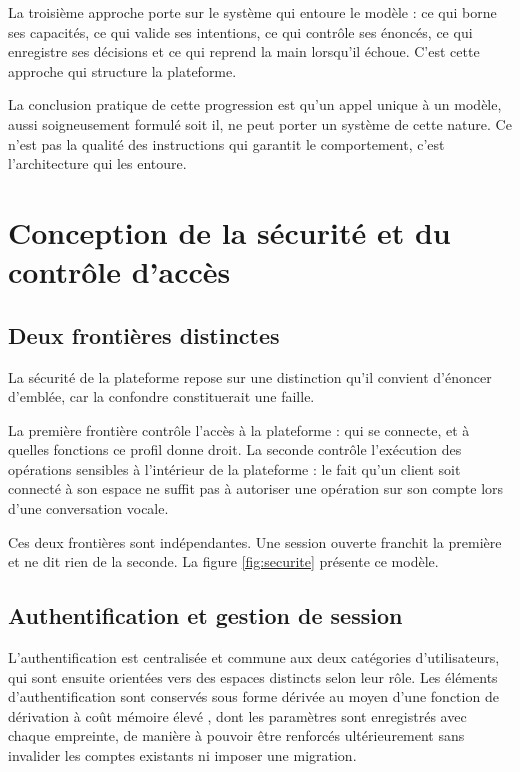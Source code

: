 La troisième approche porte sur le système qui entoure le modèle : ce qui borne ses capacités, ce qui valide ses intentions, ce qui contrôle ses énoncés, ce qui enregistre ses décisions et ce qui reprend la main lorsqu'il échoue. C'est cette approche qui structure la plateforme.

La conclusion pratique de cette progression est qu'un appel unique à un modèle, aussi soigneusement formulé soit il, ne peut porter un système de cette nature. Ce n'est pas la qualité des instructions qui garantit le comportement, c'est l'architecture qui les entoure.

\section{Conception de la sécurité et du contrôle d'accès}

\subsection{Deux frontières distinctes}

La sécurité de la plateforme repose sur une distinction qu'il convient d'énoncer d'emblée, car la confondre constituerait une faille.

La première frontière contrôle l'accès à la plateforme : qui se connecte, et à quelles fonctions ce profil donne droit. La seconde contrôle l'exécution des opérations sensibles à l'intérieur de la plateforme : le fait qu'un client soit connecté à son espace ne suffit pas à autoriser une opération sur son compte lors d'une conversation vocale.

Ces deux frontières sont indépendantes. Une session ouverte franchit la première et ne dit rien de la seconde. La figure \ref{fig:securite} présente ce modèle.


\subsection{Authentification et gestion de session}

L'authentification est centralisée et commune aux deux catégories d'utilisateurs, qui sont ensuite orientées vers des espaces distincts selon leur rôle. Les éléments d'authentification sont conservés sous forme dérivée au moyen d'une fonction de dérivation à coût mémoire élevé \cite{scrypt}, dont les paramètres sont enregistrés avec chaque empreinte, de manière à pouvoir être renforcés ultérieurement sans invalider les comptes existants ni imposer une migration.

